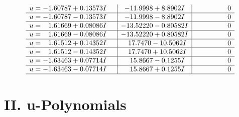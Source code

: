 \documentclass[1p]{elsarticle_modified}
\theoremstyle{definition}
\begin{document}
$$\begin{array}{c|c|c}
\begin{aligned}
u &= -1.60787 + 0.13573 I\end{aligned}
 & -11.9998 + 8.8902 I & \phantom{-0.000000 } 0 \\ \hline\begin{aligned}
u &= -1.60787 - 0.13573 I\end{aligned}
 & -11.9998 - 8.8902 I & \phantom{-0.000000 } 0 \\ \hline\begin{aligned}
u &= \phantom{-}1.61669 + 0.08086 I\end{aligned}
 & -13.52220 - 0.80582 I & \phantom{-0.000000 } 0 \\ \hline\begin{aligned}
u &= \phantom{-}1.61669 - 0.08086 I\end{aligned}
 & -13.52220 + 0.80582 I & \phantom{-0.000000 } 0 \\ \hline\begin{aligned}
u &= \phantom{-}1.61512 + 0.14352 I\end{aligned}
 & \phantom{-}17.7470 - 10.5062 I & \phantom{-0.000000 } 0 \\ \hline\begin{aligned}
u &= \phantom{-}1.61512 - 0.14352 I\end{aligned}
 & \phantom{-}17.7470 + 10.5062 I & \phantom{-0.000000 } 0 \\ \hline\begin{aligned}
u &= -1.63463 + 0.07714 I\end{aligned}
 & \phantom{-}15.8667 - 0.1255 I & \phantom{-0.000000 } 0 \\ \hline\begin{aligned}
u &= -1.63463 - 0.07714 I\end{aligned}
 & \phantom{-}15.8667 + 0.1255 I & \phantom{-0.000000 } 0\\
 \hline 
 \end{array}$$\newpage
\newpage\renewcommand{\arraystretch}{1}
\centering \section*{ II. u-Polynomials}
\end{document}
